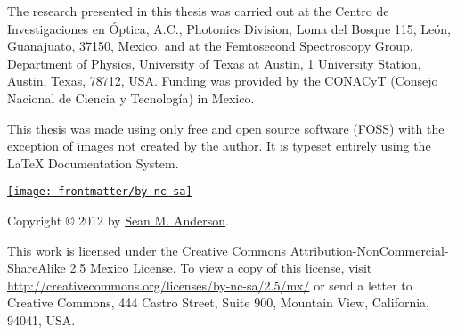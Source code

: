 \null
\vfill
\begin{flushleft}
The research presented in this thesis was carried out at the Centro de Investigaciones en \'Optica, A.C., Photonics Division, Loma del Bosque 115, Le\'on, Guanajuato, 37150, Mexico, and at the Femtosecond Spectroscopy Group, Department of Physics, University of Texas at Austin, 1 University Station, Austin, Texas, 78712, USA. Funding was provided by the CONACyT (Consejo Nacional de Ciencia y Tecnolog\'ia) in Mexico.

This thesis was made using only free and open source software (FOSS) with the exception of images not created by the author. It is typeset entirely using the \LaTeX{} Documentation System.
\vspace{1cm}

{\href{http://creativecommons.org/licenses/by-nc-sa/2.5/mx/}{\texttt{[image: frontmatter/by-nc-sa]}}}

Copyright {\sffamily\copyright{}} 2012 by \href{http://www.roguephysicist.org}{Sean M. Anderson}.

This work is licensed under the Creative Commons Attribution-NonCommercial-ShareAlike 2.5 Mexico License. To view a copy of this license, visit \url{http://creativecommons.org/licenses/by-nc-sa/2.5/mx/} or send a letter to Creative Commons, 444 Castro Street, Suite 900, Mountain View, California, 94041, USA.
\end{flushleft}
\clearpage
